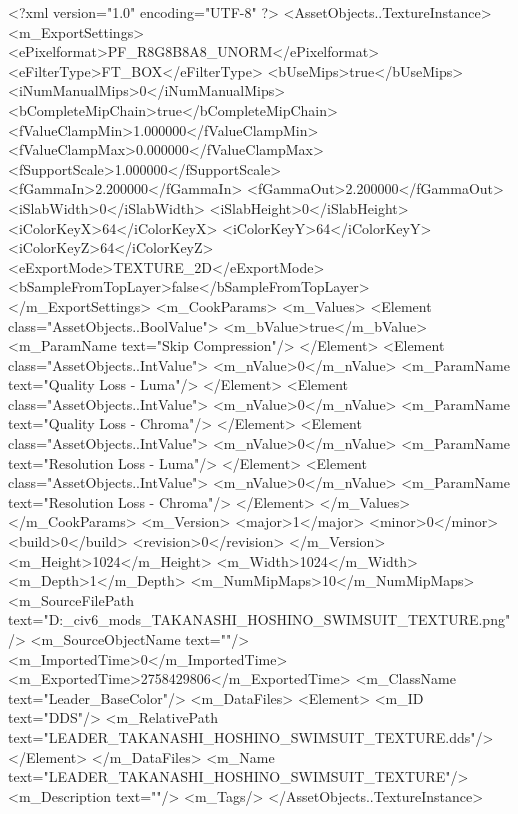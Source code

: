 <?xml version="1.0" encoding="UTF-8" ?>
<AssetObjects..TextureInstance>
	<m_ExportSettings>
		<ePixelformat>PF_R8G8B8A8_UNORM</ePixelformat>
		<eFilterType>FT_BOX</eFilterType>
		<bUseMips>true</bUseMips>
		<iNumManualMips>0</iNumManualMips>
		<bCompleteMipChain>true</bCompleteMipChain>
		<fValueClampMin>1.000000</fValueClampMin>
		<fValueClampMax>0.000000</fValueClampMax>
		<fSupportScale>1.000000</fSupportScale>
		<fGammaIn>2.200000</fGammaIn>
		<fGammaOut>2.200000</fGammaOut>
		<iSlabWidth>0</iSlabWidth>
		<iSlabHeight>0</iSlabHeight>
		<iColorKeyX>64</iColorKeyX>
		<iColorKeyY>64</iColorKeyY>
		<iColorKeyZ>64</iColorKeyZ>
		<eExportMode>TEXTURE_2D</eExportMode>
		<bSampleFromTopLayer>false</bSampleFromTopLayer>
	</m_ExportSettings>
	<m_CookParams>
		<m_Values>
			<Element class="AssetObjects..BoolValue">
				<m_bValue>true</m_bValue>
				<m_ParamName text="Skip Compression"/>
			</Element>
			<Element class="AssetObjects..IntValue">
				<m_nValue>0</m_nValue>
				<m_ParamName text="Quality Loss - Luma"/>
			</Element>
			<Element class="AssetObjects..IntValue">
				<m_nValue>0</m_nValue>
				<m_ParamName text="Quality Loss - Chroma"/>
			</Element>
			<Element class="AssetObjects..IntValue">
				<m_nValue>0</m_nValue>
				<m_ParamName text="Resolution Loss - Luma"/>
			</Element>
			<Element class="AssetObjects..IntValue">
				<m_nValue>0</m_nValue>
				<m_ParamName text="Resolution Loss - Chroma"/>
			</Element>
		</m_Values>
	</m_CookParams>
	<m_Version>
		<major>1</major>
		<minor>0</minor>
		<build>0</build>
		<revision>0</revision>
	</m_Version>
	<m_Height>1024</m_Height>
	<m_Width>1024</m_Width>
	<m_Depth>1</m_Depth>
	<m_NumMipMaps>10</m_NumMipMaps>
	<m_SourceFilePath text="D:\Documents\GitHub\Uzuki_civ6_mods\BankHeisters\LEADER_TAKANASHI_HOSHINO_SWIMSUIT_TEXTURE.png"/>
	<m_SourceObjectName text=""/>
	<m_ImportedTime>0</m_ImportedTime>
	<m_ExportedTime>2758429806</m_ExportedTime>
	<m_ClassName text="Leader_BaseColor"/>
	<m_DataFiles>
		<Element>
			<m_ID text="DDS"/>
			<m_RelativePath text="LEADER_TAKANASHI_HOSHINO_SWIMSUIT_TEXTURE.dds"/>
		</Element>
	</m_DataFiles>
	<m_Name text="LEADER_TAKANASHI_HOSHINO_SWIMSUIT_TEXTURE"/>
	<m_Description text=""/>
	<m_Tags/>
</AssetObjects..TextureInstance>

